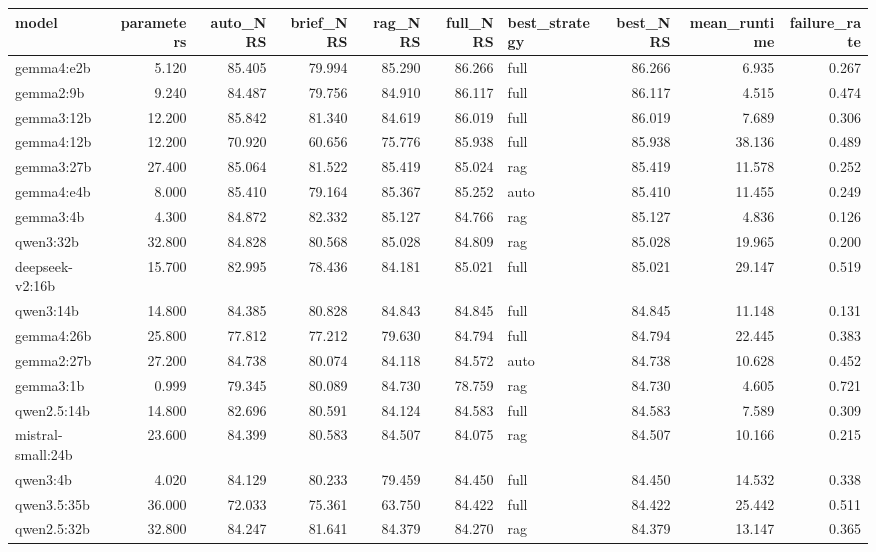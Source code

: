 \begin{tabular}{lrrrrrlrrr}
\toprule
model & parameters & auto\_NRS & brief\_NRS & rag\_NRS & full\_NRS & best\_strategy & best\_NRS & mean\_runtime & failure\_rate \\
\midrule
gemma4:e2b & 5.120 & 85.405 & 79.994 & 85.290 & 86.266 & full & 86.266 & 6.935 & 0.267 \\
gemma2:9b & 9.240 & 84.487 & 79.756 & 84.910 & 86.117 & full & 86.117 & 4.515 & 0.474 \\
gemma3:12b & 12.200 & 85.842 & 81.340 & 84.619 & 86.019 & full & 86.019 & 7.689 & 0.306 \\
gemma4:12b & 12.200 & 70.920 & 60.656 & 75.776 & 85.938 & full & 85.938 & 38.136 & 0.489 \\
gemma3:27b & 27.400 & 85.064 & 81.522 & 85.419 & 85.024 & rag & 85.419 & 11.578 & 0.252 \\
gemma4:e4b & 8.000 & 85.410 & 79.164 & 85.367 & 85.252 & auto & 85.410 & 11.455 & 0.249 \\
gemma3:4b & 4.300 & 84.872 & 82.332 & 85.127 & 84.766 & rag & 85.127 & 4.836 & 0.126 \\
qwen3:32b & 32.800 & 84.828 & 80.568 & 85.028 & 84.809 & rag & 85.028 & 19.965 & 0.200 \\
deepseek-v2:16b & 15.700 & 82.995 & 78.436 & 84.181 & 85.021 & full & 85.021 & 29.147 & 0.519 \\
qwen3:14b & 14.800 & 84.385 & 80.828 & 84.843 & 84.845 & full & 84.845 & 11.148 & 0.131 \\
gemma4:26b & 25.800 & 77.812 & 77.212 & 79.630 & 84.794 & full & 84.794 & 22.445 & 0.383 \\
gemma2:27b & 27.200 & 84.738 & 80.074 & 84.118 & 84.572 & auto & 84.738 & 10.628 & 0.452 \\
gemma3:1b & 0.999 & 79.345 & 80.089 & 84.730 & 78.759 & rag & 84.730 & 4.605 & 0.721 \\
qwen2.5:14b & 14.800 & 82.696 & 80.591 & 84.124 & 84.583 & full & 84.583 & 7.589 & 0.309 \\
mistral-small:24b & 23.600 & 84.399 & 80.583 & 84.507 & 84.075 & rag & 84.507 & 10.166 & 0.215 \\
qwen3:4b & 4.020 & 84.129 & 80.233 & 79.459 & 84.450 & full & 84.450 & 14.532 & 0.338 \\
qwen3.5:35b & 36.000 & 72.033 & 75.361 & 63.750 & 84.422 & full & 84.422 & 25.442 & 0.511 \\
qwen2.5:32b & 32.800 & 84.247 & 81.641 & 84.379 & 84.270 & rag & 84.379 & 13.147 & 0.365 \\

\end{tabular}
